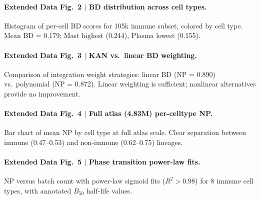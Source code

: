 \documentclass[10pt]{article}
\begin{document}
\paragraph{Extended Data Fig.~2 $|$ BD distribution across cell types.}
Histogram of per-cell BD scores for 105k immune subset, colored by cell type. Mean BD = 0.179; Mast highest (0.244), Plasma lowest (0.155).

\paragraph{Extended Data Fig.~3 $|$ KAN vs.\ linear BD weighting.}
Comparison of integration weight strategies: linear BD (NP = 0.890) vs.\ polynomial (NP = 0.872). Linear weighting is sufficient; nonlinear alternatives provide no improvement.

\paragraph{Extended Data Fig.~4 $|$ Full atlas (4.83M) per-celltype NP.}
Bar chart of mean NP by cell type at full atlas scale. Clear separation between immune (0.47--0.53) and non-immune (0.62--0.75) lineages.

\paragraph{Extended Data Fig.~5 $|$ Phase transition power-law fits.}
NP versus batch count with power-law sigmoid fits ($R^2 > 0.98$) for 8 immune cell types, with annotated $B_{50}$ half-life values.
\end{document}
